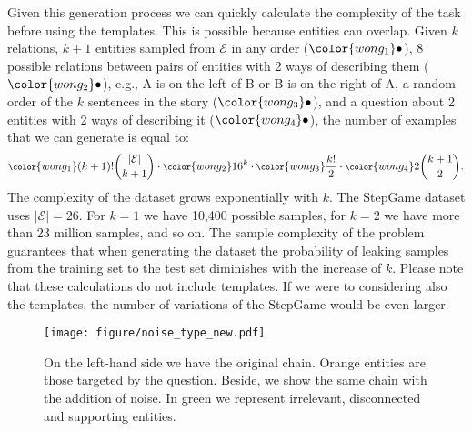 \documentclass[letterpaper]{article} \usepackage{aaai22}  \usepackage{times}  \usepackage{helvet}  \usepackage{courier}  \usepackage[hyphens]{url}  \usepackage{graphicx} \urlstyle{rm} \def\UrlFont{\rm}  \usepackage{natbib}  \usepackage{caption} \DeclareCaptionStyle{ruled}{labelfont=normalfont,labelsep=colon,strut=off} \frenchspacing  \setlength{\pdfpagewidth}{8.5in}  \setlength{\pdfpageheight}{11in}  \usepackage{algorithm}
\begin{document}

Given this generation process we can quickly calculate the complexity of the task before using the templates. This is possible because entities can overlap. 
Given $k$ relations, $k+1$ entities sampled from $\mathcal{E}$ in any order (${\color{wong_1}\bullet}$), 8 possible relations between pairs of entities with 2 ways of describing them (${\color{wong_2}\bullet}$), e.g., A is on the left of B or B is on the right of A, a random order of the $k$ sentences in the story (${\color{wong_3}\bullet}$), and a question about 2 entities with 2 ways of describing it (${\color{wong_4}\bullet}$), 
the number of examples that we can generate is equal to: 
\begin{equation}\footnotesize
{\color{wong_1}(k+1)!\binom{|\mathcal{E}|}{k+1}} \cdot
{\color{wong_2}16^k}\cdot
{\color{wong_3}\frac{k!}{2}}\cdot
{\color{wong_4}2\binom{k+1}{2}}.
\end{equation}
The complexity of the dataset grows exponentially with $k$. The StepGame dataset uses $|\mathcal{E}| = 26$. For $k=1$ we have 10,400 possible samples, for $k=2$ we have more than 23 million samples, and so on. The sample complexity of the problem guarantees that when generating the dataset the probability of leaking samples from the training set to the test set diminishes with the increase of $k$. Please note that these calculations do not include templates. If we were to considering also the templates, the number of variations of the StepGame would be even larger.



\begin{figure}[!t]
  \centering
\texttt{[image: figure/noise\_type\_new.pdf]}
  \caption{On the left-hand side we have the original chain. Orange entities are those targeted by the question. Beside, we show the same chain with the addition of noise. In green we represent irrelevant, disconnected and supporting entities.}
  \label{fig:example_noise}
\end{figure}
\end{document}
